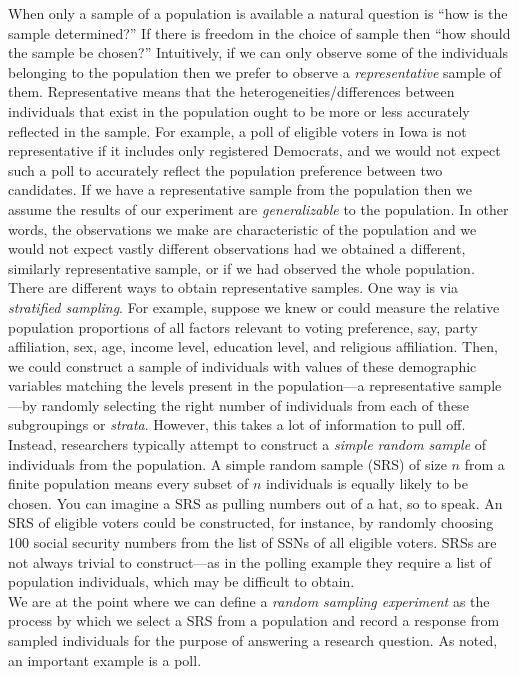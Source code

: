 \documentclass[
]{book}
\begin{document}
When only a sample of a population is available a natural question is ``how is the sample determined?'' If there is freedom in the choice of sample then ``how should the sample be chosen?'' Intuitively, if we can only observe some of the individuals belonging to the population then we prefer to observe a \emph{representative} sample of them. Representative means that the heterogeneities/differences between individuals that exist in the population ought to be more or less accurately reflected in the sample. For example, a poll of eligible voters in Iowa is not representative if it includes only registered Democrats, and we would not expect such a poll to accurately reflect the population preference between two candidates. If we have a representative sample from the population then we assume the results of our experiment are \emph{generalizable} to the population. In other words, the observations we make are characteristic of the population and we would not expect vastly different observations had we obtained a different, similarly representative sample, or if we had observed the whole population. There are different ways to obtain representative samples. One way is via \emph{stratified sampling}. For example, suppose we knew or could measure the relative population proportions of all factors relevant to voting preference, say, party affiliation, sex, age, income level, education level, and religious affiliation. Then, we could construct a sample of individuals with values of these demographic variables matching the levels present in the population---a representative sample---by randomly selecting the right number of individuals from each of these subgroupings or \emph{strata}. However, this takes a lot of information to pull off. Instead, researchers typically attempt to construct a \emph{simple random sample} of individuals from the population. A simple random sample (SRS) of size \(n\) from a finite population means every subset of \(n\) individuals is equally likely to be chosen. You can imagine a SRS as pulling numbers out of a hat, so to speak. An SRS of eligible voters could be constructed, for instance, by randomly choosing 100 social security numbers from the list of SSNs of all eligible voters. SRSs are not always trivial to construct---as in the polling example they require a list of population individuals, which may be difficult to obtain.\\

We are at the point where we can define a \emph{random sampling experiment} as the process by which we select a SRS from a population and record a response from sampled individuals for the purpose of answering a research question. As noted, an important example is a poll.
\end{document}

